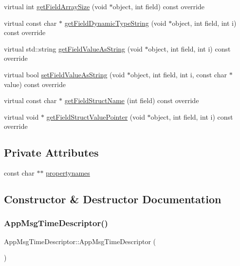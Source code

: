 \begin{DoxyCompactItemize}
virtual int \hyperlink{class_app_msg_time_descriptor_a57eb5d1436a72fc03d674e70cf46af7e}{get\+Field\+Array\+Size} (void $\ast$object, int field) const override
\item 
virtual const char $\ast$ \hyperlink{class_app_msg_time_descriptor_a8e410f5a62c300aae0066bc7c979d953}{get\+Field\+Dynamic\+Type\+String} (void $\ast$object, int field, int i) const override
\item 
virtual std\+::string \hyperlink{class_app_msg_time_descriptor_adfd92cca9d3fdd2705e303d1f5121c07}{get\+Field\+Value\+As\+String} (void $\ast$object, int field, int i) const override
\item 
virtual bool \hyperlink{class_app_msg_time_descriptor_abb26d4a890c0ec9753b49970adfd597c}{set\+Field\+Value\+As\+String} (void $\ast$object, int field, int i, const char $\ast$value) const override
\item 
virtual const char $\ast$ \hyperlink{class_app_msg_time_descriptor_a0b91efc1f981d4594f4361e9dab2dd49}{get\+Field\+Struct\+Name} (int field) const override
\item 
virtual void $\ast$ \hyperlink{class_app_msg_time_descriptor_a974b4e6fe474d1a56870c30030efe18d}{get\+Field\+Struct\+Value\+Pointer} (void $\ast$object, int field, int i) const override
\end{DoxyCompactItemize}
\subsection*{Private Attributes}
\begin{DoxyCompactItemize}
\item 
const char $\ast$$\ast$ \hyperlink{class_app_msg_time_descriptor_a102cbf09a1ba7e40df81cca8c3c503b4}{propertynames}
\end{DoxyCompactItemize}


\subsection{Constructor \& Destructor Documentation}
\mbox{\label{class_app_msg_time_descriptor_aa1c0a48d43a21f17d556759173b321b5}} 
\subsubsection{\texorpdfstring{App\+Msg\+Time\+Descriptor()}{AppMsgTimeDescriptor()}}
{\footnotesize\ttfamily App\+Msg\+Time\+Descriptor\+::\+App\+Msg\+Time\+Descriptor (\begin{DoxyParamCaption}{ }\end{DoxyParamCaption})}

